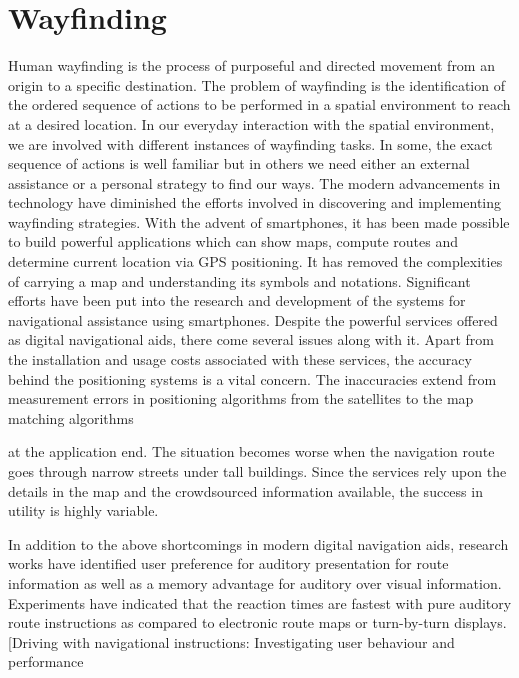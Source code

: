 \documentclass{iitkthesis}
\begin{document}
\section{Wayfinding}
Human wayfinding is the process of purposeful and directed movement from an origin to a specific destination. The problem of wayfinding is the identification of the ordered sequence of actions to be performed in a spatial environment to reach at a desired location. In our everyday interaction with the spatial environment, we are involved with different instances of wayfinding tasks. In some, the exact sequence of actions is well familiar but in others we need either an external assistance or a personal strategy to find our ways. The modern advancements in technology have diminished the efforts involved in discovering and implementing wayfinding strategies. With the advent of smartphones, it has been made possible to build powerful applications which can show maps, compute routes and determine current location via GPS positioning. It has removed the complexities of carrying a map and understanding its symbols and notations. Significant efforts have been put into the research and development of the systems for navigational assistance using smartphones. 
Despite the powerful services offered as digital navigational aids, there come several issues along with it. Apart from the installation and usage costs associated with these services, the accuracy behind the positioning systems is a vital concern. The inaccuracies extend from measurement errors in positioning algorithms from the satellites to the map matching algorithms 
\iffalse 
[D.K. Yang, B.G. Cai and Y.F. Yuan,An Improved Map-Matching Algorithm Used in Vehicle Navigation System]
\fi
 at the application end. The situation becomes worse when the navigation route goes through narrow streets under tall buildings. Since the services rely upon the details in the map and the crowdsourced information available, the success in utility is highly variable. 
  
In addition to the above shortcomings in modern digital navigation aids, research works have identified user preference for auditory presentation for route information as well as a memory advantage for auditory over visual information. Experiments have indicated that the reaction times are fastest with pure auditory route instructions as compared to electronic route maps or turn-by-turn displays. 
\iffalse
[Driving with navigational instructions:
Investigating user behaviour and
performance
\end{document}
